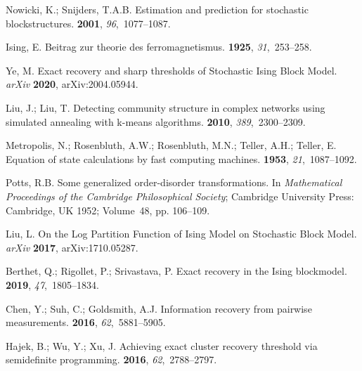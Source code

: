\documentclass[entropy,article,accept,moreauthors,pdftex]{Definitions/mdpi}
\newcommand{\1}{\mathbbm{1}}
\begin{document}
\begin{thebibliography}{999}
Nowicki, K.; Snijders, T.A.B.
\newblock Estimation and prediction for stochastic blockstructures.
 {\bf 2001},
  {\em 96},~1077--1087.

Ising, E.
\newblock Beitrag zur theorie des ferromagnetismus.
 {\bf 1925}, {\em 31},~253--258.

Ye, M.
\newblock Exact recovery and sharp thresholds of Stochastic Ising Block Model. \emph{arXiv} \textbf{2020}, arXiv:2004.05944.

Liu, J.; Liu, T.
\newblock Detecting community structure in complex networks using simulated
  annealing with k-means algorithms.
 {\bf 2010}, {\em 389},~2300--2309.

Metropolis, N.; Rosenbluth, A.W.; Rosenbluth, M.N.; Teller, A.H.; Teller, E.
\newblock Equation of state calculations by fast computing machines.
 {\bf 1953}, {\em
  21},~1087--1092.

Potts, R.B.
\newblock Some generalized order-disorder transformations. In \emph{Mathematical Proceedings of the Cambridge Philosophical Society};
  {Cambridge University Press: Cambridge, UK} 1952; Volume~48, pp. 106--109.


Liu, L.
\newblock On the Log Partition Function of Ising Model on Stochastic Block
  Model. {\em arXiv} {\bf 2017}, arXiv:1710.05287.

Berthet, Q.; Rigollet, P.; Srivastava, P.
\newblock Exact recovery in the Ising blockmodel.
 {\bf 2019}, {\em 47},~1805--1834.

Chen, Y.; Suh, C.; Goldsmith, A.J.
\newblock Information recovery from pairwise measurements.
 {\bf 2016}, {\em
  62},~5881--5905.

Hajek, B.; Wu, Y.; Xu, J.
\newblock Achieving exact cluster recovery threshold via semidefinite
  programming.
 {\bf 2016}, {\em
  62},~2788--2797.


\end{thebibliography}
\end{document}
